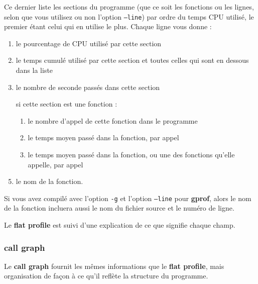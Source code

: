 \documentclass[a4paper,twoside]{article}
\begin{document}
Ce dernier liste les sections du programme (que ce soit les fonctions ou les lignes, selon que vous utilisez ou non l'option \texttt{--line}) par ordre du temps CPU utilisé, le premier étant celui qui en utilise le plus. Chaque ligne vous donne : 
\begin{enumerate}
\item le pourcentage de CPU utilisé par cette section
\item le temps cumulé utilisé par cette section et toutes celles qui sont en dessous dans la liste
\item le nombre de seconde passés dans cette section
\item [si cette section est une fonction] : 
\begin{enumerate}
\item le nombre d'appel de cette fonction dans le programme
\item le temps moyen passé dans la fonction, par appel
\item le temps moyen passé dans la fonction, ou une des fonctions qu'elle appelle, par appel
\end{enumerate}
\item le nom de la fonction.
\end{enumerate}

\begin{remarque}
Si vous avez compilé avec l'option \texttt{-g} et l'option \texttt{--line} pour \textbf{gprof}, alors le nom de la fonction incluera aussi le nom du fichier source et le numéro de ligne. 

Le \textbf{flat profile} est suivi d'une explication de ce que signifie chaque champ.
\end{remarque}

\subsubsection{call graph}
Le \textbf{call graph} fournit les mêmes informations que le \textbf{flat profile}, mais organisation de façon à ce qu'il reflète la structure du programme. 
\end{document}
